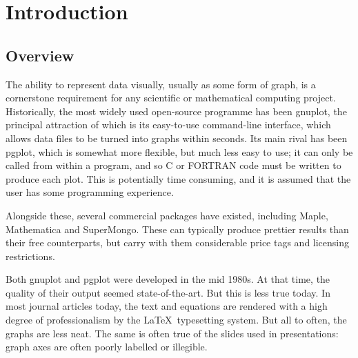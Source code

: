 %
%
%
%
%



\chapter{Introduction}

\label{introduction}

\section{Overview}

The ability to represent data visually, usually as some form of graph, is a
cornerstone requirement for any scientific or mathematical computing project.
Historically, the most widely used open-source programme has been {\sc
gnuplot}, the principal attraction of which is its easy-to-use
command-line interface, which allows data files to be turned into graphs within
seconds. Its main rival has been {\sc pgplot}, which is somewhat
more flexible, but much less easy to use; it can only be called from within a
program, and so C or FORTRAN code must be written to produce each plot. This is
potentially time consuming, and it is assumed that the user has some
programming experience.

Alongside these, several commercial packages have existed, including {\sc
Maple}, {\sc Mathematica} and {\sc
SuperMongo}.  These can typically produce prettier results
than their free counterparts, but carry with them considerable price tags and
licensing restrictions.

Both gnuplot and pgplot were developed in the mid 1980s. At that time, the
quality of their output seemed state-of-the-art. But this is less true today.
In most journal articles today, the text and equations are rendered with a high
degree of professionalism by the \LaTeX\ typesetting system. But all to often,
the graphs are less neat.  The same is often true of the slides used in
presentations: graph axes are often poorly labelled or illegible.

